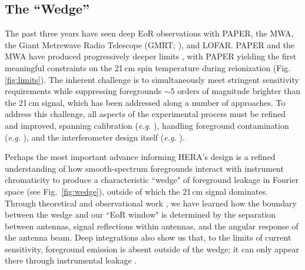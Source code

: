\documentclass[preprint,11pt]{aastex}
\begin{document}
\subsection{The ``Wedge''}
The past three years have seen deep EoR observations with PAPER, the MWA, 
the Giant Metrewave Radio Telescope (GMRT; \citealt{paciga_et_al2013}), and LOFAR.
PAPER and the MWA have produced progressively deeper limits
\citep{dillon_et_al2015,parsons_etal2014,ali_et_al2015}, with PAPER
yielding the first meaningful constraints on the 21\,cm spin temperature during reionization
(Fig. \ref{fig:limits}).
The inherent challenge is to simultaneously meet stringent sensitivity requirements 
while suppressing foregrounds $\sim5$ orders of magnitude
brighter than the 21\,cm signal, which has been addressed along a number of approaches.  
To address this challenge,  all aspects of the experimental process must be refined and improved, spanning 
calibration ({\em e.g.} \cite{zheng_et_al2014, jacobs_et_al2016, barry_et_al2016}), handling foreground contamination
({\em e.g.} \cite{moore_et_al2013,moore_et_al2016,thyagarajan_et_al2015a,pober_et_al2016}),
and the interferometer design itself ({\em e.g.} \cite{parsons_et_al2012a,dillon_parsons2016}).

Perhaps the most important advance informing HERA's design is a
refined understanding of how smooth-spectrum foregrounds interact
with instrument chromaticity to produce a characteristic ``wedge" of
foreground leakage in Fourier space (see Fig.~\ref{fig:wedge}), 
outside of which the 21\,cm signal dominates.
Through theoretical and observational work
\citep{datta_etal2010,morales_et_al2012,parsons_et_al2012b,vedantham_2012,thyagarajan_et_al2013,hazelton_et_al2013,pober_etal2013b,liu_et_al2014a,liu_et_al2014b},
we have learned how the boundary between the wedge and our ``EoR window" is determined by the separation between antennas,
signal reflections within antennas, and the angular response of the antenna beam.  Deep integrations also show us
that, to the limits of current sensitivity, foreground emission is absent outside of the wedge; it can only 
appear there through instrumental leakage \citep{parsons_etal2014,ali_et_al2015,moore_et_al2016,kohn_et_al2016}.
\end{document}
